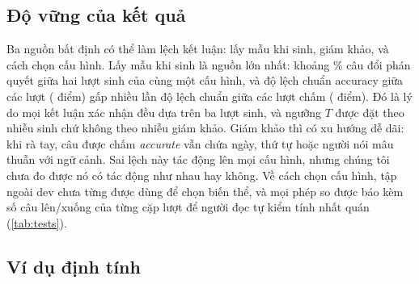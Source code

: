 \subsection{Độ vững của kết quả}\label{sec:robust}
Ba nguồn bất định có thể làm lệch kết luận: lấy mẫu khi sinh, giám khảo, và cách chọn cấu hình.
Lấy mẫu khi sinh là nguồn lớn nhất: khoảng \flipRate\% câu đổi phán quyết giữa hai lượt sinh của cùng một cấu hình, và độ lệch chuẩn accuracy giữa các lượt (\sdGenGV{} điểm) gấp nhiều lần độ lệch chuẩn giữa các lượt chấm (\sdJudgeBase{} điểm).
Đó là lý do mọi kết luận xác nhận đều dựa trên ba lượt sinh, và ngưỡng $T$ được đặt theo nhiễu sinh chứ không theo nhiễu giám khảo.
Giám khảo thì có xu hướng dễ dãi: khi rà tay, \judgeLenient{} câu được chấm \emph{accurate} vẫn chứa ngày, thứ tự hoặc người nói mâu thuẫn với ngữ cảnh.
Sai lệch này tác động lên mọi cấu hình, nhưng chúng tôi chưa đo được nó có tác động như nhau hay không.
Về cách chọn cấu hình, tập ngoài dev chưa từng được dùng để chọn biến thể, và mọi phép so được báo kèm số câu lên/xuống của từng cặp lượt để người đọc tự kiểm tính nhất quán (\cref{tab:tests}).

\subsection{Ví dụ định tính}
